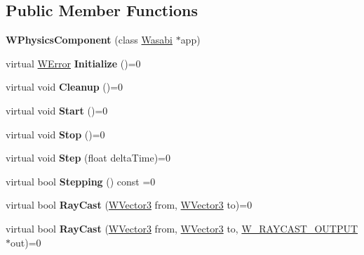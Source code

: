 \subsection*{Public Member Functions}
\begin{DoxyCompactItemize}
\item 
{\bfseries W\+Physics\+Component} (class \hyperlink{class_wasabi}{Wasabi} $\ast$app)\hypertarget{class_w_physics_component_a330a9c2171625e635077628710a5c791}{}\label{class_w_physics_component_a330a9c2171625e635077628710a5c791}

\item 
virtual \hyperlink{class_w_error}{W\+Error} {\bfseries Initialize} ()=0\hypertarget{class_w_physics_component_ae47fb5fd65dd04e911e2e4556521a95e}{}\label{class_w_physics_component_ae47fb5fd65dd04e911e2e4556521a95e}

\item 
virtual void {\bfseries Cleanup} ()=0\hypertarget{class_w_physics_component_a0bd9f12509e3df621fefe95cc57d94c5}{}\label{class_w_physics_component_a0bd9f12509e3df621fefe95cc57d94c5}

\item 
virtual void {\bfseries Start} ()=0\hypertarget{class_w_physics_component_aa5bdb9b2ce52e87c115bbe9e82aa3f4e}{}\label{class_w_physics_component_aa5bdb9b2ce52e87c115bbe9e82aa3f4e}

\item 
virtual void {\bfseries Stop} ()=0\hypertarget{class_w_physics_component_a5ca6e5bb31b7da33d65bb8f6e8657acb}{}\label{class_w_physics_component_a5ca6e5bb31b7da33d65bb8f6e8657acb}

\item 
virtual void {\bfseries Step} (float delta\+Time)=0\hypertarget{class_w_physics_component_aaa6aaa8d91c9e2c9a09da6404781fac4}{}\label{class_w_physics_component_aaa6aaa8d91c9e2c9a09da6404781fac4}

\item 
virtual bool {\bfseries Stepping} () const  =0\hypertarget{class_w_physics_component_aaa3ea3ab9f5f843c1225273f64f2d169}{}\label{class_w_physics_component_aaa3ea3ab9f5f843c1225273f64f2d169}

\item 
virtual bool {\bfseries Ray\+Cast} (\hyperlink{class_w_vector3}{W\+Vector3} from, \hyperlink{class_w_vector3}{W\+Vector3} to)=0\hypertarget{class_w_physics_component_a4ef62394c1f005c60bef3d1555da8243}{}\label{class_w_physics_component_a4ef62394c1f005c60bef3d1555da8243}

\item 
virtual bool {\bfseries Ray\+Cast} (\hyperlink{class_w_vector3}{W\+Vector3} from, \hyperlink{class_w_vector3}{W\+Vector3} to, \hyperlink{struct_w___r_a_y_c_a_s_t___o_u_t_p_u_t}{W\+\_\+\+R\+A\+Y\+C\+A\+S\+T\+\_\+\+O\+U\+T\+P\+UT} $\ast$out)=0\hypertarget{class_w_physics_component_a7d2b249889b98d862eab3f801cfd25b1}{}\label{class_w_physics_component_a7d2b249889b98d862eab3f801cfd25b1}

\end{DoxyCompactItemize}
